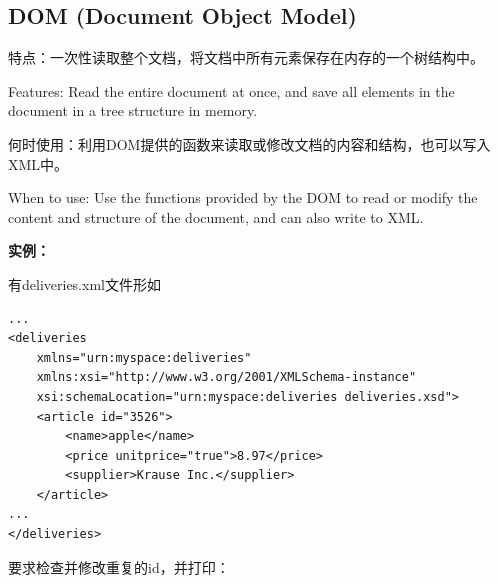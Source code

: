 \documentclass[fontset=windows]{article}
\begin{document}
\subsection{DOM (Document Object Model)}

特点：一次性读取整个文档，将文档中所有元素保存在内存的一个树结构中。

Features: Read the entire document at once, and save all elements in the document in a tree structure in memory.

何时使用：利用DOM提供的函数来读取或修改文档的内容和结构，也可以写入XML中。

When to use: Use the functions provided by the DOM to read or modify the content and structure of the document, and can also write to XML.

\textbf{实例：}

有deliveries.xml文件形如
\begin{verbatim}
...
<deliveries 
	xmlns="urn:myspace:deliveries" 
	xmlns:xsi="http://www.w3.org/2001/XMLSchema-instance" 
	xsi:schemaLocation="urn:myspace:deliveries deliveries.xsd">
	<article id="3526">
		<name>apple</name>
		<price unitprice="true">8.97</price>
		<supplier>Krause Inc.</supplier>
	</article>
...
</deliveries>
\end{verbatim}

要求检查并修改重复的id，并打印：
\end{document}
